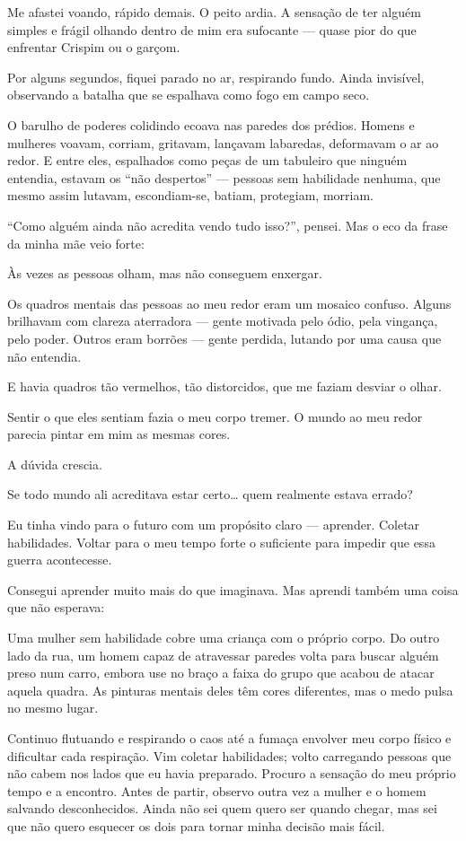 Me afastei voando, rápido demais.  
O peito ardia.  
A sensação de ter alguém simples e frágil olhando dentro de mim era sufocante — quase pior do que enfrentar Crispim ou o garçom.

Por alguns segundos, fiquei parado no ar, respirando fundo.  
Ainda invisível, observando a batalha que se espalhava como fogo em campo seco.

O barulho de poderes colidindo ecoava nas paredes dos prédios.  
Homens e mulheres voavam, corriam, gritavam, lançavam labaredas, deformavam o ar ao redor.  
E entre eles, espalhados como peças de um tabuleiro que ninguém entendia, estavam os “não despertos” — pessoas sem habilidade nenhuma, que mesmo assim lutavam, escondiam-se, batiam, protegiam, morriam.

“Como alguém ainda não acredita vendo tudo isso?”, pensei.  
Mas o eco da frase da minha mãe veio forte:

Às vezes as pessoas olham, mas não conseguem enxergar.

Os quadros mentais das pessoas ao meu redor eram um mosaico confuso.  
Alguns brilhavam com clareza aterradora — gente motivada pelo ódio, pela vingança, pelo poder.  
Outros eram borrões — gente perdida, lutando por uma causa que não entendia.

E havia quadros tão vermelhos, tão distorcidos, que me faziam desviar o olhar.

Sentir o que eles sentiam fazia o meu corpo tremer.  
O mundo ao meu redor parecia pintar em mim as mesmas cores.

A dúvida crescia.

Se todo mundo ali acreditava estar certo…  
quem realmente estava errado?

Eu tinha vindo para o futuro com um propósito claro —  
aprender.  
Coletar habilidades.  
Voltar para o meu tempo forte o suficiente para impedir que essa guerra acontecesse.

Consegui aprender muito mais do que imaginava.  
Mas aprendi também uma coisa que não esperava:

Uma mulher sem habilidade cobre uma criança com o próprio corpo. Do outro lado da rua, um homem capaz de atravessar paredes volta para buscar alguém preso num carro, embora use no braço a faixa do grupo que acabou de atacar aquela quadra. As pinturas mentais deles têm cores diferentes, mas o medo pulsa no mesmo lugar.

Continuo flutuando e respirando o caos até a fumaça envolver meu corpo físico e dificultar cada respiração. Vim coletar habilidades; volto carregando pessoas que não cabem nos lados que eu havia preparado. Procuro a sensação do meu próprio tempo e a encontro. Antes de partir, observo outra vez a mulher e o homem salvando desconhecidos. Ainda não sei quem quero ser quando chegar, mas sei que não quero esquecer os dois para tornar minha decisão mais fácil.
